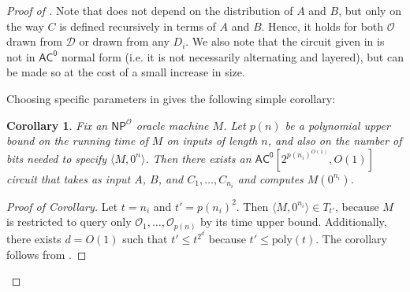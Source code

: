 \documentclass[11pt]{article}%
\newtheorem{corollary}[theorem]{Corollary}
\newcommand{\poly}{\mathrm{poly}}
\begin{document}
\begin{proof}[Proof of ]
Note that  does not depend on the distribution of $A$ and $B$, but only on the way $C$ is defined recursively in terms of $A$ and $B$. Hence, it holds for both $\mathcal{O}$ drawn from $\mathcal{D}$ or drawn from any $D_i$. We also note that the circuit given in  is not in $\mathsf{AC^0}$ normal form (i.e. it is not necessarily alternating and layered), but can be made so at the cost of a small increase in size.

Choosing specific parameters in  gives the following simple corollary:
\begin{corollary}
\label{cor:recursive_np_ac0_M}
Fix an $\mathsf{NP}^\mathcal{O}$ oracle machine $M$. Let $p(n)$ be a polynomial upper bound on the running time of $M$ on inputs of length $n$, and also on the number of bits needed to specify $\langle M, 0^n \rangle$. Then there exists an $\mathsf{AC^0}\left[2^{p(n_i)^{O(1)}}, O(1) \right]$ circuit that takes as input $A$, $B$, and $C_1,\ldots,C_{n_i}$ and computes $M\left(0^{n_i}\right)$.
\end{corollary}

\begin{proof}[Proof of Corollary]
Let $t = n_i$ and $t' = p(n_i)^2$. Then $\langle M, 0^{n_i} \rangle \in T_{t'}$, because $M$ is restricted to query only $\mathcal{O}_1,\ldots,\mathcal{O}_{p(n)}$ by its time upper bound. Additionally, there exists $d = O(1)$ such that $t' \le t^{2^d}$ because $t' \le \poly(t)$. The corollary follows from .
\end{proof}



\end{proof}
\end{document}
